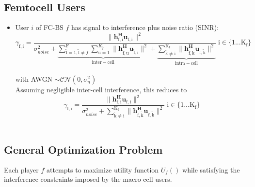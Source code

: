 \documentclass[12pt,a4paper]{report}
\begin{document}
\subsection{Femtocell Users}
\begin{itemize}

\item User $i$ of FC-BS $f$ has signal to interference plus noise ratio (SINR):
	\begin{equation*}
	\gamma_{\mathrm{f,i}} = \frac{\|\mathbf{h^H_{\mathrm{f,i}}u_{\mathrm{f,i}}}\|^2}
	{\sigma^2_{noise}   +
	\underbrace{
	 \sum_{\mathrm{\tilde{f}}=1,\mathrm{\tilde{f}}\neq f}^{\mathrm{F}} \sum_{\mathrm{u=1}}^{K_{\mathrm{\tilde{f}}}}
	\|\mathbf{h^H_{\mathrm{\tilde{f},u}}u_{\mathrm{\tilde{f},i}}}\|^2}_{\mathrm{inter-cell}}
	 + 
	 \underbrace{
	 \sum_{\mathrm{\tilde{k}\neq i}}^{\mathrm{K_f}}
	 \|\mathbf{h^H_{\mathrm{f,\tilde{k}}}u_{\mathrm{f,\tilde{k}}}}\|^2}_{\mathrm{intra-cell}}}
	  \; \mathrm{i \in \{1 ... K_f\}}\end{equation*}
\\
with AWGN $\sim \mathcal{CN}(0,\sigma^2_n)$
\\

Assuming negligible inter-cell interference, this reduces to
	\begin{equation*}
	\gamma_{\mathrm{f,i}} = \frac{\|\mathbf{h^H_{\mathrm{f,i}}u_{\mathrm{f,i}}}\|^2}
	{\sigma^2_{noise} 
	 + \sum_{\mathrm{\tilde{k}\neq i}}^{\mathrm{K_f}}
	  \|\mathbf{h^H_{\mathrm{f,\tilde{k}}}u_{\mathrm{f,\tilde{k}}}}\|^2}
	  \; \mathrm{i \in \{1 ... K_f\}}
	\end{equation*}
\\


\end{itemize}





\subsection{General Optimization Problem}

Each player $f$ attempts to maximize utility function $U_f()$ while satisfying the interference constraints imposed by the macro cell users.
\par
\end{document}
